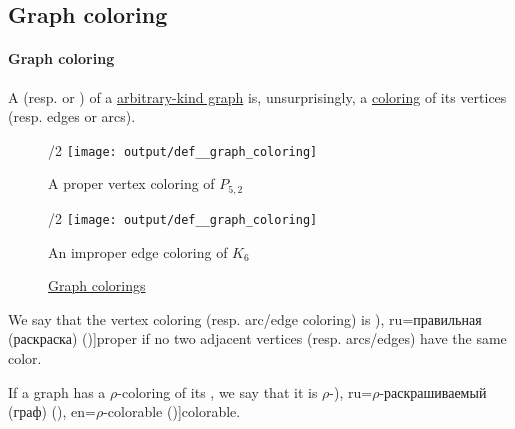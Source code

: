 \subsection{Graph coloring}\label{subsec:graph_coloring}

\paragraph{Graph coloring}

\begin{definition}\label{def:graph_coloring}
  A  (resp.  or ) of a \hyperref[rem:arbitrary_kind_graph]{arbitrary-kind graph} is, unsurprisingly, a \hyperref[def:set_coloring]{coloring} of its vertices (resp. edges or arcs).

  \begin{figure}[!ht]
    \begin{subcaptionblock}{\textwidth/2}
      \centering
      \texttt{[image: output/def\_\_graph\_coloring]}
      \caption{A proper vertex coloring of \hyperref[def:petersen_graph]{\( P_{5,2} \)}}\label{fig:def:graph_coloring/petersen}
    \end{subcaptionblock}
    \hfill
    \begin{subcaptionblock}{\textwidth/2}
      \centering
      \texttt{[image: output/def\_\_graph\_coloring]}
      \caption{An improper edge coloring of \hyperref[def:complete_graph]{\( K_6 \)}}\label{fig:def:graph_coloring/triangle}
    \end{subcaptionblock}
    \caption{\hyperref[def:graph_coloring]{Graph colorings}}\label{fig:def:graph_coloring}
  \end{figure}

  \begin{thmenum}
     We say that the vertex coloring (resp. arc/edge coloring) is \term[bg=правилно (оцветяване) (\cite[141]{Мирчев2001}), ru=правильная (раскраска) (\cite[306]{Емеличев1990})]{proper} if no two adjacent vertices (resp. arcs/edges) have the same color.

     If a graph has a \( \rho \)-coloring of its , we say that it is \( \rho \)-\term[bg=\( \rho \)-оцветим (граф) (\cite[141]{Мирчев2001}), ru=\( \rho \)-раскрашиваемый (граф) (\cite[\S 53]{Емеличев1990}), en=\( \rho \)-colorable (\cite[111]{Diestel2005})]{colorable}.
  \end{thmenum}
\end{definition}
